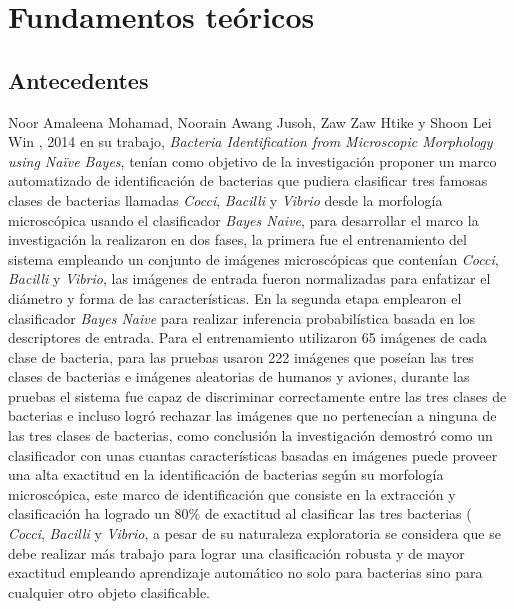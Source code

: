 \chapter{Fundamentos te\'oricos}

\section{Antecedentes}

Noor Amaleena Mohamad, Noorain Awang Jusoh, Zaw Zaw Htike y Shoon
Lei Win , 2014 en su trabajo, \textit{ Bacteria Identification from Microscopic Morphology using Naïve Bayes}, tenían como  objetivo de la investigación  proponer un marco automatizado de identificación de bacterias que pudiera clasificar tres famosas clases de bacterias llamadas  \textit{Cocci}, \textit{Bacilli} y  \textit{Vibrio} desde la morfología microscópica usando el clasificador \textit{Bayes Naive}, para desarrollar el marco la investigación la realizaron en dos fases, la primera fue el entrenamiento del sistema empleando un  conjunto de imágenes microscópicas que contenían  \textit{Cocci},  \textit{Bacilli} y  \textit{Vibrio}, las imágenes de entrada fueron normalizadas para enfatizar el diámetro y forma de las características. En la segunda etapa emplearon el clasificador \textit{Bayes Naive} para realizar inferencia probabilística basada en los descriptores de entrada. Para el entrenamiento  utilizaron 65 imágenes de cada clase de bacteria, para las pruebas usaron 222 imágenes que poseían las tres clases de bacterias e imágenes aleatorias de humanos y aviones, durante las pruebas el sistema fue capaz de discriminar correctamente entre las tres clases de bacterias e incluso logró rechazar las imágenes que no pertenecían a ninguna de las tres clases de bacterias, como conclusión la investigación demostró como un clasificador con unas cuantas características basadas en imágenes puede proveer una alta exactitud en la identificación de bacterias según su morfología microscópica, este marco de identificación que consiste en la extracción y clasificación ha logrado un 80\% de exactitud al clasificar las tres bacterias ( \textit{Cocci},  \textit{Bacilli} y  \textit{Vibrio}, a pesar de su naturaleza exploratoria se considera que se debe realizar más trabajo para lograr una clasificación robusta y de mayor exactitud empleando aprendizaje automático no solo para bacterias sino para cualquier otro objeto clasificable.\\

